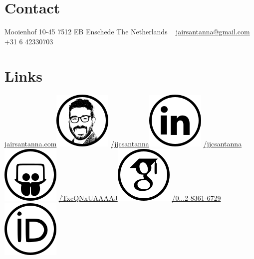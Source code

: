 \documentclass[print]{styles/friggeri-cv-mac} %
\begin{document}

\begin{aside} 
 \section{Contact}
 Mooienhof 10-45
 7512 EB Enschede
 The Netherlands
~
\href{mailto:jairsantanna@gmail.com}{jairsantanna@gmail.com}
+31 6 42330703
~
\section{Links}\hspace{-1cm}
\hspace{-0.5cm}\href{http://www.jairsantanna.com}{jairsantanna.com}\includegraphics[scale=0.4]{img/jairsantanna.png}
\href{https://www.linkedin.com/in/jjcsantanna}{/jjcsantanna}\includegraphics[scale=0.3]{img/linkedin.png}
\href{http://www.slideshare.net/jjcsantanna}{/jjcsantanna}\includegraphics[scale=0.3]{img/slideshare.png}
\href{https://scholar.google.com/citations?user=TxcQNxUAAAAJ}{/TxcQNxUAAAAJ}\includegraphics[scale=0.3]{img/googlescholar.png}
\href{http://orcid.org/0000-0002-8361-6729}{/0...2-8361-6729}\includegraphics[scale=0.3]{img/orcid.png}

\end{aside}
\end{document}
